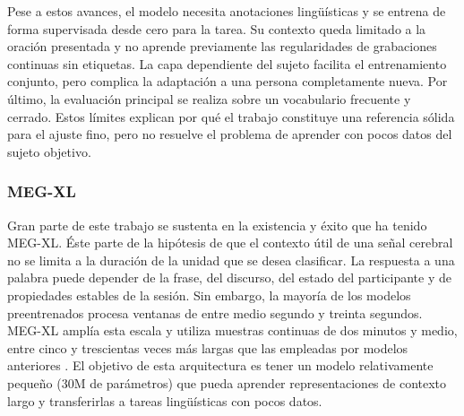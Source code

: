 Pese a estos avances, el modelo necesita anotaciones lingüísticas y se entrena de forma supervisada desde cero para la tarea. Su contexto queda limitado a la oración presentada y no aprende previamente las regularidades de grabaciones continuas sin etiquetas. La capa dependiente del sujeto facilita el entrenamiento conjunto, pero complica la adaptación a una persona completamente nueva. Por último, la evaluación principal se realiza sobre un vocabulario frecuente y cerrado. Estos límites explican por qué el trabajo constituye una referencia sólida para el ajuste fino, pero no resuelve el problema de aprender con pocos datos del sujeto objetivo.

\subsubsection{MEG-XL}

Gran parte de este trabajo se sustenta en la existencia y éxito que ha tenido MEG-XL. Éste parte de la hipótesis de que el contexto útil de una señal cerebral no se limita a la duración de la unidad que se desea clasificar. La respuesta a una palabra puede depender de la frase, del discurso, del estado del participante y de propiedades estables de la sesión. Sin embargo, la mayoría de los modelos preentrenados procesa ventanas de entre medio segundo y treinta segundos. MEG-XL amplía esta escala y utiliza muestras continuas de dos minutos y medio, entre cinco y trescientas veces más largas que las empleadas por modelos anteriores \cite{jayalath2026megxl}. El objetivo de esta arquitectura es tener un modelo relativamente pequeño (30M de parámetros) que pueda aprender representaciones de contexto largo y transferirlas a tareas lingüísticas con pocos datos.

